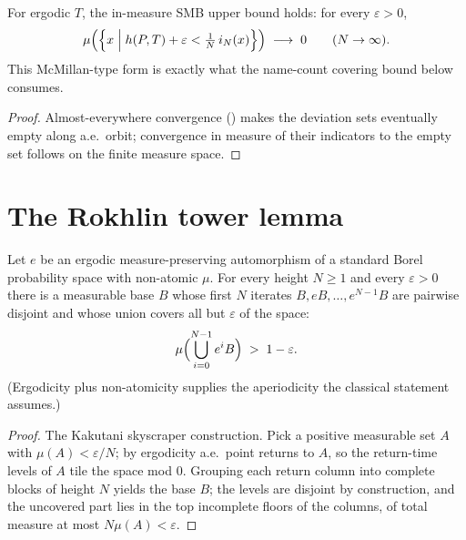 \begin{theorem}\label{upperSMBInMeasure_of_ergodic}
  \leanok
  For ergodic \(T\), the in-measure SMB upper bound
   holds: for every \(\varepsilon > 0\),
  \[
    \mu\Bigl(\Bigl\{x \;\Big|\; h(P,T) + \varepsilon < \tfrac1N\, i_N(x)\Bigr\}\Bigr)
      \;\longrightarrow\; 0 \qquad (N \to \infty).
  \]
  This McMillan-type form is exactly what the name-count covering bound below consumes.
\end{theorem}
\begin{proof}\leanok
  Almost-everywhere convergence () makes the deviation sets
  eventually empty along a.e.\ orbit; convergence in measure of their indicators to the empty set
  follows on the finite measure space.
\end{proof}

\section{The Rokhlin tower lemma}

\begin{theorem}\label{rokhlin_tower}
  \leanok
  Let \(e\) be an ergodic measure-preserving automorphism of a standard Borel probability space
  with non-atomic \(\mu\). For every height \(N \ge 1\) and every \(\varepsilon > 0\) there is a
  measurable base \(B\) whose first \(N\) iterates \(B, eB, \dots, e^{N-1}B\) are pairwise
  disjoint and whose union covers all but \(\varepsilon\) of the space:
  \[
    \mu\Bigl(\bigcup_{i=0}^{N-1} e^{i}B\Bigr) \;>\; 1 - \varepsilon.
  \]
  (Ergodicity plus non-atomicity supplies the aperiodicity the classical statement assumes.)
\end{theorem}
\begin{proof}\leanok
  The Kakutani skyscraper construction. Pick a positive measurable set \(A\) with
  \(\mu(A) < \varepsilon/N\); by ergodicity a.e.\ point returns to \(A\), so the return-time
  levels of \(A\) tile the space mod \(0\). Grouping each return column into complete blocks of
  height \(N\) yields the base \(B\); the levels are disjoint by construction, and the uncovered
  part lies in the top incomplete floors of the columns, of total measure at most
  \(N\mu(A) < \varepsilon\).
\end{proof}

